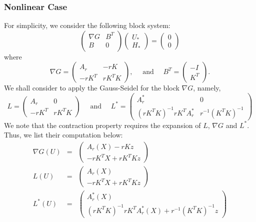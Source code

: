 \subsubsection{Nonlinear Case} 
For simplicity, we consider the following block system: 
\begin{equation}
\begin{pmatrix}
\nabla G  & B^T \\
B  & 0\\
\end{pmatrix} 
\begin{pmatrix}
U_* \\
H_*
\end{pmatrix} = 
\begin{pmatrix}
0\\
0
\end{pmatrix}
\end{equation}
where 
\begin{equation}
\nabla G = \begin{pmatrix}
A_r & -r K\\
-r K^T & rK^T K
\end{pmatrix}, \quad \mbox{ and } \quad 
B^T = \begin{pmatrix}
-I \\K^T
\end{pmatrix}.
\end{equation}
We shall consider to apply the Gauss-Seidel for the block $\nabla G$, namely, 
\begin{equation}
L = \begin{pmatrix}
A_r & 0\\
-r K^T & rK^T K 
\end{pmatrix} 
\quad \mbox{ and } \quad L^{*} = \begin{pmatrix}
A_r^{*} & 0\\
(rK^T K)^{-1} rK^T A_r^{*} & r^{-1} (K^T K)^{-1} 
\end{pmatrix} 
\end{equation}
We note that the contraction property requires the expansion of $L$, $\nabla G$ and $L^*$. Thus, we list their computation below: 
\begin{eqnarray*}
\nabla G(U) &=& 
\begin{pmatrix}
A_r(X) - r K z \\ 
-r K^T X + r K^T K z 
\end{pmatrix} \\ 
L(U) &=& 
\begin{pmatrix}
A_r(X) \\ 
-r K^T X + r K^T K z 
\end{pmatrix} \\ 
L^*(U) &=& 
\begin{pmatrix}
A_r^*(X) \\ 
(r K^TK)^{-1}r K^T A_r^{*}(X) + r^{-1} (K^T K)^{-1} z 
\end{pmatrix} 
\end{eqnarray*}

